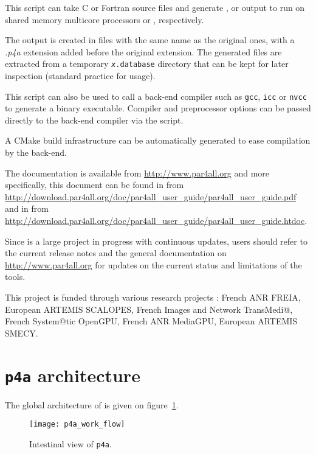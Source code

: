 \documentclass[a4paper]{article}
\begin{document}
This script can take C or Fortran source files and generate \Aopenmp,
\Acuda or \Aopencl output to run on shared memory multicore processors or
\Agpu, respectively.

The output is created in files with the same name as the original ones, with a
\emph{.p4a} extension added before the original extension. The generated files are
extracted from a temporary \texttt{\emph{x}.database} directory that can be kept
for later inspection (standard practice for \Apips usage).

This script can also be used to call a back-end compiler such as
\texttt{gcc}, \texttt{icc} or \texttt{nvcc} to generate a binary
executable. Compiler and preprocessor options can be passed directly
to the back-end compiler via the script.

A CMake build infrastructure can be automatically generated to ease
compilation by the back-end.

The \Apfa documentation is available from \url{http://www.par4all.org} and
more specifically, this document can be found in \Apdf from
\url{http://download.par4all.org/doc/par4all_user_guide/par4all_user_guide.pdf}
and in \Ahtml from
\url{http://download.par4all.org/doc/par4all_user_guide/par4all_user_guide.htdoc}.

Since \Apfa is a large project in progress with continuous updates,
users should refer to the current release notes and the general
documentation on
\url{http://www.par4all.org} for updates on
the current status and limitations of the tools.

This project is funded through various research projects : French ANR
FREIA, European ARTEMIS SCALOPES, French Images and Network TransMedi@,
French System@tic OpenGPU, French ANR MediaGPU, European ARTEMIS SMECY.

\section{\protect\texttt{p4a} architecture}
\label{sec:p4a-architecture}

The global architecture of \Apfa is given on
figure~\ref{fig:transit_intestinal}.

\begin{figure}
  \texttt{[image: p4a\_work\_flow]}
  \caption{Intestinal view of \texttt{p4a}.}
  \label{fig:transit_intestinal}
\end{figure}
\end{document}
